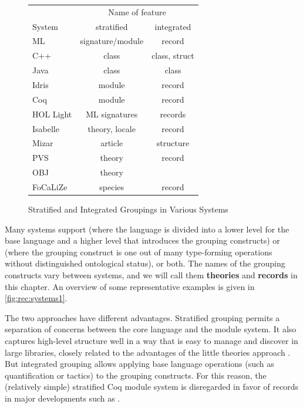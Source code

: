 \begin{figure}[ht]\centering%
\begin{tabular}{|l||c|c|}\hline
       & \multicolumn{2}{c|}{Name of feature}\\
System & stratified & integrated \\\hline\hline
ML     & signature/module & record\\
C++    & class     & class, struct\\
Java   & class     & class\\
Idris \cite{idris} & module       & record \\\hline
Coq \cite{coq}    & module    & record \\
HOL Light \cite{hollight} & ML signatures & records \\
Isabelle \cite{isabellemanual} & theory, locale & record \\
Mizar \cite{mizar}  & article   & structure\\
PVS \cite{pvs}   & theory    & record \\
OBJ \cite{obj}   & theory    & \\
FoCaLiZe \cite{focalize} & species & record \\\hline
\end{tabular}
\caption{Stratified and Integrated Groupings in Various Systems}\label{fig:rec:systems1}
\end{figure}
Many systems support  (where the language is divided into a lower
level for the base language and a higher level that introduces the grouping constructs) or
 (where the grouping construct is one out of many type-forming
operations without distinguished ontological status), or both.
The names of the grouping constructs vary between systems, and we will call them \textbf{theories} and \textbf{records} in this chapter.
An overview of some representative examples is given in \autoref{fig:rec:systems1}. 

The two approaches have different advantages.
Stratified grouping permits a separation of concerns between the core language and the module system.
It also captures high-level structure well in a way that is easy to manage and discover in large libraries, closely related to the advantages of the little theories approach \cite{littletheories}.
But integrated grouping allows applying base language operations (such as quantification or tactics) to the grouping constructs.
For this reason, the (relatively simple) stratified Coq module system is disregarded in favor of records in major developments such as \cite{MathComponents:base}.

